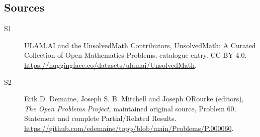 \documentclass[11pt]{article}
\begin{document}
\subsection{Sources}
\begin{description}
\item[\hypertarget{source:statement:1}{S1}] ULAM.AI and the UnsolvedMath Contributors, UnsolvedMath: A Curated Collection of Open Mathematics Problems, catalogue entry. CC BY 4.0. \url{https://huggingface.co/datasets/ulamai/UnsolvedMath}.
\item[\hypertarget{source:statement:2}{S2}] Erik D. Demaine, Joseph S. B. Mitchell and Joseph O\textquotesingle Rourke (editors), \emph{The Open Problems Project}, maintained original source, Problem 60, Statement and complete Partial/Related Results. \url{https://github.com/edemaine/topp/blob/main/Problems/P.000060}.
\end{description}
\label{end:statement}
\end{document}
